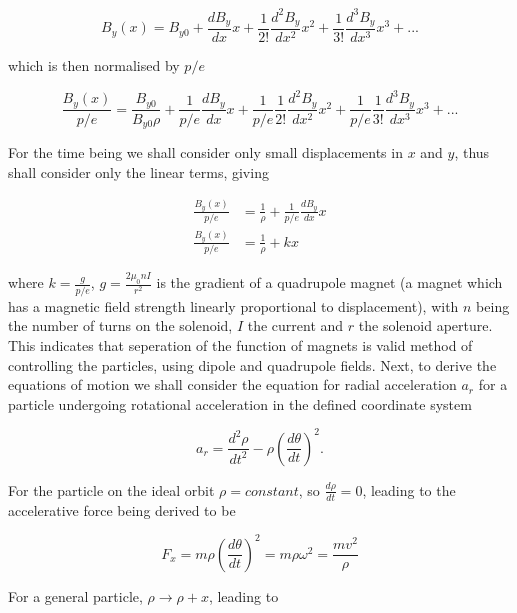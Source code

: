 \begin{equation}
B_{y} \left( x \right) = B_{y0} + \frac{dB_{y}}{dx} x + \frac{1}{2!}\frac{d^{2}B_{y}}{dx^{2}} x^{2} + \frac{1}{3!} \frac{d^{3}B_{y}}{dx^{3}} x^{3} + ...
\end{equation}

which is then normalised by $p/e$

\begin{equation}
\frac{B_{y} \left( x \right)}{p/e} = \frac{B_{y0}}{B_{y0}\rho} + \frac{1}{p/e}\frac{dB_{y}}{dx} x + \frac{1}{p/e}\frac{1}{2!}\frac{d^{2}B_{y}}{dx^{2}} x^{2} + \frac{1}{p/e}\frac{1}{3!} \frac{d^{3}B_{y}}{dx^{3}} x^{3} + ...
\end{equation}

For the time being we shall consider only small displacements in $x$ and $y$, thus shall consider only the linear terms, giving

\begin{align}
\frac{B_{y} \left( x \right)}{p/e} &= \frac{1}{\rho} + \frac{1}{p/e}\frac{dB_{y}}{dx} x \\
\frac{B_{y} \left( x \right)}{p/e} &= \frac{1}{\rho} + k x
\end{align}

where $k = \frac{g}{p/e}$, $g=\frac{2\mu_{0}nI}{r^{2}}$ is the gradient of a quadrupole magnet (a magnet which has a magnetic field strength linearly proportional to displacement), with $n$ being the number of turns on the solenoid, $I$ the current and $r$ the solenoid aperture. This indicates that seperation of the function of magnets is valid method of controlling the particles, using dipole and quadrupole fields. Next, to derive the equations of motion we shall consider the equation for radial acceleration $a_{r}$ for a particle undergoing rotational acceleration in the defined coordinate system

\begin{equation}
a_{r} = \frac{d^{2}\rho}{dt^{2}} - \rho \left( \frac{d\theta}{dt} \right)^{2}.
\end{equation}

For the particle on the ideal orbit $\rho = constant$, so $\frac{d \rho}{dt} = 0$, leading to the accelerative force being derived to be

\begin{equation}
F_{x} = m \rho \left( \frac{d\theta}{dt} \right)^{2} = m\rho \omega^{2} = \frac{mv^{2}}{\rho}
\end{equation} 

For a general particle, $\rho \rightarrow \rho + x$, leading to


